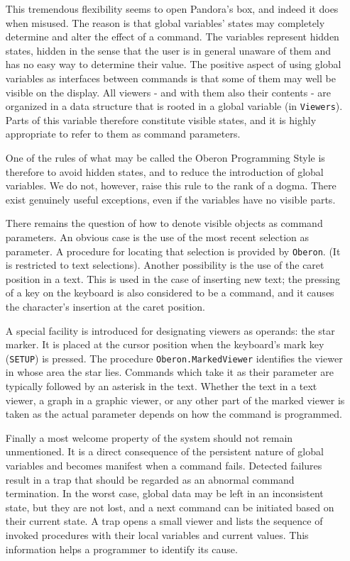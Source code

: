 \begin{itemize}
This tremendous flexibility seems to open Pandora's box, and indeed it does when misused.
The reason is that global variables' states may completely determine and alter the effect
of a command. The variables represent hidden states, hidden in the sense that the user is
in general unaware of them and has no easy way to determine their value. The positive
aspect of using global variables as interfaces between commands is that some of them may
well be visible on the display. All viewers - and with them also their contents - are
organized in a data structure that is rooted in a global variable (in \verb|Viewers|).
Parts of this variable therefore constitute visible states, and it is highly appropriate
to refer to them as command parameters.

One of the rules of what may be called the Oberon Programming Style is therefore to avoid
hidden states, and to reduce the introduction of global variables. We do not, however,
raise this rule to the rank of a dogma. There exist genuinely useful exceptions, even if
the variables have no visible parts.

  \item[There] remains the question of how to denote visible objects as command parameters.
An obvious case is the use of the most recent selection as parameter. A procedure for
locating that selection is provided by \verb|Oberon|. (It is restricted to text selections).
Another possibility is the use of the caret position in a text. This is used in the case
of inserting new text; the pressing of a key on the keyboard is also considered to be a
command, and it causes the character's insertion at the caret position.

A special facility is introduced for designating viewers as operands: the star marker.
It is placed at the cursor position when the keyboard's mark key (\verb|SETUP|) is pressed.
The procedure \verb|Oberon.MarkedViewer| identifies the viewer in whose area the star lies.
Commands which take it as their parameter are typically followed by an asterisk in the text.
Whether the text in a text viewer, a graph in a graphic viewer, or any other part of the
marked viewer is taken as the actual parameter depends on how the command is programmed.

  \item[Finally] a most welcome property of the system should not remain unmentioned. It
is a direct consequence of the persistent nature of global variables and becomes manifest
when a command fails. Detected failures result in a trap that should be regarded as an
abnormal command termination. In the worst case, global data may be left in an inconsistent
state, but they are not lost, and a next command can be initiated based on their current state.
A trap opens a small viewer and lists the sequence of invoked procedures with their local
variables and current values. This information helps a programmer to identify its cause.
\end{itemize}

